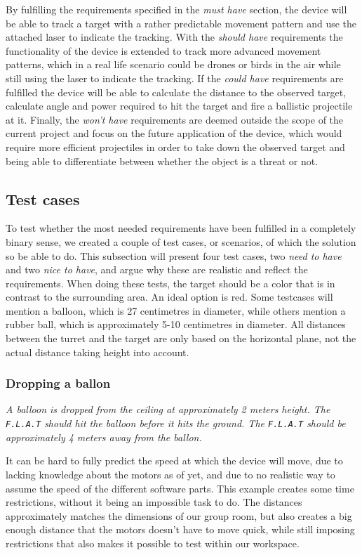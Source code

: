 By fulfilling the requirements specified in the \textit{must have} section, the device will be able to track a target with a rather predictable movement pattern and use the attached laser to indicate the tracking. 
With the \textit{should have} requirements the functionality of the device is extended to track more advanced movement patterns, which in a real life scenario could be drones or birds in the air while still using the laser to indicate the tracking.
If the \textit{could have} requirements are fulfilled the device will be able to calculate the distance to the observed target, calculate angle and power required to hit the target and fire a ballistic projectile at it.
Finally, the \textit{won't have} requirements are deemed outside the scope of the current project and focus on the future application of the device, which would require more efficient projectiles in order to take down the observed target and being able to differentiate between whether the object is a threat or not.

\subsection{Test cases}
To test whether the most needed requirements have been fulfilled in a completely binary sense, we created a couple of test cases, or scenarios, of which the solution so be able to do. 
This subsection will present four test cases, two \textit{need to have} and two \textit{nice to have}, and argue why these are realistic and reflect the requirements.
When doing these tests, the target should be a color that is in contrast to the surrounding area.
An ideal option is red.
Some testcases will mention a balloon, which is 27 centimetres in diameter, while others mention a rubber ball, which is approximately 5-10 centimetres in diameter.
All distances between the turret and the target are only based on the horizontal plane, not the actual distance taking height into account.

\subsubsection{Dropping a ballon}
\textit{A balloon is dropped from the ceiling at approximately 2 meters height.	
The \texttt{F.L.A.T} should hit the balloon before it hits the ground.
The \texttt{F.L.A.T} should be approximately 4 meters away from the ballon.}

It can be hard to fully predict the speed at which the device will move, due to lacking knowledge about the motors as of yet, and due to no realistic way to assume the speed of the different software parts.
This example creates some time restrictions, without it being an impossible task to do.
The distances approximately matches the dimensions of our group room, but also creates a big enough distance that the motors doesn't have to move quick, while still imposing restrictions that also makes it possible to test within our workspace.

